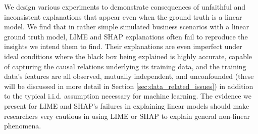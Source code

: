 \documentclass[mnsc,blindrev]{informs3}
\begin{document}

    We design various experiments to demonstrate consequences of unfaithful and inconsistent explanations that appear even when the ground truth is a linear model. We find that in rather simple simulated business scenarios with a linear ground truth model, LIME and SHAP explanations often fail to reproduce the insights we intend them to find. Their explanations are even imperfect under ideal conditions where the black box being explained is highly accurate, capable of capturing the causal relations underlying its training data, and the training data's features are all observed, mutually independent, and unconfounded (these will be discussed in more detail in Section \ref{sec:data_related_issues}) in addition to the typical i.i.d. assumption necessary for machine learning. The evidence we present for LIME and SHAP's failures in explaining linear models should make researchers very cautious in using LIME or SHAP to explain general non-linear phenomena.%
    
\end{document}
